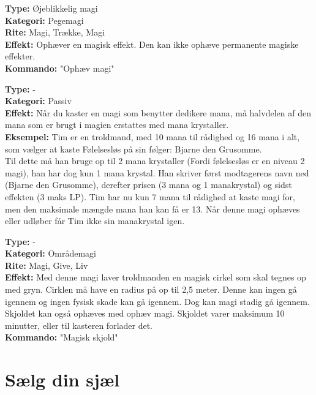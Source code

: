 \begin{primærMagi*}
\textbf{Type:} Øjeblikkelig magi\\
\textbf{Kategori:} Pegemagi\\
\textbf{Rite:} Magi, Trække, Magi\\
\textbf{Effekt:} Ophæver en magisk effekt. Den kan ikke ophæve permanente magiske effekter.\\ 
\textbf{Kommando:} "Ophæv magi"
\end{primærMagi*}

\begin{primærMagi*}
\textbf{Type:} - \\
\textbf{Kategori:} Passiv \\
\textbf{Effekt:} Når du kaster en magi som benytter dedikere mana, må halvdelen af den mana som er brugt i magien erstattes med mana krystaller.\\
\textbf{Eksempel:} Tim er en troldmand, med 10 mana til rådighed og 16 mana i alt, som vælger at kaste Følelsesløs på sin følger: Bjarne den Grusomme.\\ 
Til dette må han bruge op til 2 mana krystaller (Fordi følelsesløs er en niveau 2 magi), han har dog kun 1 mana krystal. Han skriver først modtagerens navn ned (Bjarne den Grusomme), derefter prisen (3 mana og 1 manakrystal) og sidst effekten (3 maks LP).
Tim har nu kun 7 mana til rådighed at kaste magi for, men den maksimale mængde mana han kan få er 13. Når denne magi ophæves eller udløber får Tim ikke sin manakrystal igen.
\end{primærMagi*}

\begin{primærMagi*}
\textbf{Type:} -\\
\textbf{Kategori:} Områdemagi \\
\textbf{Rite:} Magi, Give, Liv \\
\textbf{Effekt:} Med denne magi laver troldmanden en magisk cirkel som skal tegnes op med gryn. Cirklen må have
en radius på op til 2,5 meter. Denne kan ingen gå igennem og ingen fysisk skade kan gå igennem. Dog kan magi stadig gå igennem. Skjoldet kan også ophæves med ophæv magi. Skjoldet varer maksimum 10 minutter, eller til kasteren forlader det. \\
\textbf{Kommando:} "Magisk skjold"
\end{primærMagi*}

\section*{Sælg din sjæl}


